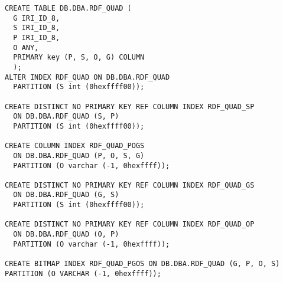 \begin{verbatim}
CREATE TABLE DB.DBA.RDF_QUAD (
  G IRI_ID_8,
  S IRI_ID_8,
  P IRI_ID_8,
  O ANY,
  PRIMARY key (P, S, O, G) COLUMN
  );
ALTER INDEX RDF_QUAD ON DB.DBA.RDF_QUAD
  PARTITION (S int (0hexffff00));

CREATE DISTINCT NO PRIMARY KEY REF COLUMN INDEX RDF_QUAD_SP
  ON DB.DBA.RDF_QUAD (S, P)
  PARTITION (S int (0hexffff00));

CREATE COLUMN INDEX RDF_QUAD_POGS
  ON DB.DBA.RDF_QUAD (P, O, S, G)
  PARTITION (O varchar (-1, 0hexffff));

CREATE DISTINCT NO PRIMARY KEY REF COLUMN INDEX RDF_QUAD_GS
  ON DB.DBA.RDF_QUAD (G, S)
  PARTITION (S int (0hexffff00));

CREATE DISTINCT NO PRIMARY KEY REF COLUMN INDEX RDF_QUAD_OP
  ON DB.DBA.RDF_QUAD (O, P)
  PARTITION (O varchar (-1, 0hexffff));

CREATE BITMAP INDEX RDF_QUAD_PGOS ON DB.DBA.RDF_QUAD (G, P, O, S)
PARTITION (O VARCHAR (-1, 0hexffff));
\end{verbatim}

